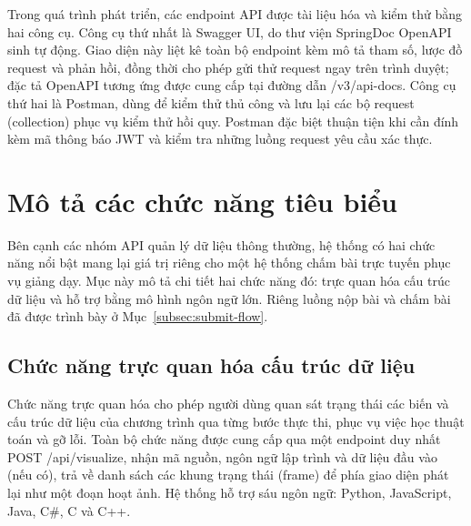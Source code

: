 \documentclass[12pt, a4paper]{report}
\begin{document}
Trong quá trình phát triển, các endpoint \ac{API} được tài liệu hóa và kiểm thử bằng hai công
cụ. Công cụ thứ nhất là Swagger UI, do thư viện SpringDoc OpenAPI sinh tự động. Giao diện này
liệt kê toàn bộ endpoint kèm mô tả tham số, lược đồ request và phản hồi, đồng thời cho phép gửi
thử request ngay trên trình duyệt; đặc tả OpenAPI tương ứng được cung cấp tại đường dẫn
/v3/api-docs. Công cụ thứ hai là Postman, dùng để kiểm thử thủ công và lưu lại các bộ request
(collection) phục vụ kiểm thử hồi quy. Postman đặc biệt thuận tiện khi cần đính kèm mã thông báo
\ac{JWT} và kiểm tra những luồng request yêu cầu xác thực.

\section{Mô tả các chức năng tiêu biểu}

Bên cạnh các nhóm \ac{API} quản lý dữ liệu thông thường, hệ thống có hai chức năng nổi bật mang
lại giá trị riêng cho một hệ thống chấm bài trực tuyến phục vụ giảng dạy. Mục này mô tả chi tiết
hai chức năng đó: trực quan hóa cấu trúc dữ liệu và hỗ trợ bằng mô hình ngôn ngữ lớn. Riêng
luồng nộp bài và chấm bài đã được trình bày ở Mục~\ref{subsec:submit-flow}.

\subsection{Chức năng trực quan hóa cấu trúc dữ liệu}

Chức năng trực quan hóa cho phép người dùng quan sát trạng thái các biến và cấu trúc dữ
liệu của chương trình qua từng bước thực thi, phục vụ việc học thuật toán và gỡ lỗi. Toàn
bộ chức năng được cung cấp qua một endpoint duy nhất POST /api/visualize, nhận mã nguồn,
ngôn ngữ lập trình và dữ liệu đầu vào (nếu có), trả về danh sách các khung trạng thái
(frame) để phía giao diện phát lại như một đoạn hoạt ảnh. Hệ thống hỗ trợ sáu ngôn ngữ:
Python, JavaScript, Java, C\#, C và C++.
\end{document}
